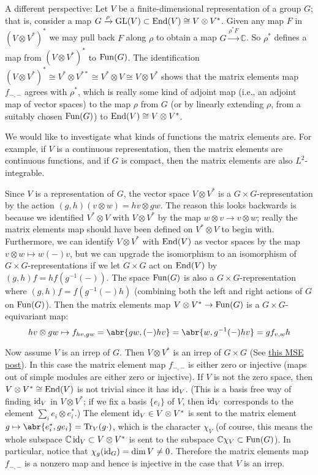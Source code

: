 \documentclass[../../rtnotes.tex]{subfiles}
\begin{document}
A different perspective: Let $V$ be a finite-dimensional representation of a group $G$; that is, consider a map $G\xrightarrow{\rho}\operatorname{GL}(V)\subset \operatorname{End}(V)\cong V\otimes V^\ast$. Given any map $F$ in $(V\otimes V^\ast)^\ast$ we may pull back $F$ along $\rho$ to obtain a map $G\xrightarrow{\rho^\ast F}\mathbb C$. So $\rho^\ast$ defines a map from $(V\otimes V^\ast)^\ast$ to $\operatorname{Fun}(G)$. The identification $(V\otimes V^\ast)^\ast\cong V^\ast\otimes V^{\ast\ast}\cong V^\ast\otimes V\cong V\otimes V^\ast$ shows that the matrix elements map $f_{-,-}$ agrees with $\rho^\ast$, which is really some kind of adjoint map (i.e., an adjoint map of vector spaces) to the map $\rho$ from $G$ (or by linearly extending $\rho$, from a suitably chosen $\operatorname{Fun}(G)$) to $\operatorname{End}(V)\cong V\otimes V^\ast$.

We would like to investigate what kinds of functions the matrix elements are. For example, if $V$ is a continuous representation, then the matrix elements are continuous functions, and if $G$ is compact, then the matrix elements are also $L^2$-integrable. 

Since $V$ is a representation of $G$, the vector space $V\otimes V^\ast$ is a $G\times G$-representation by the action $(g,h)(v\otimes w) = hv\otimes gw$. The reason this looks backwards is because we identified $V^\ast\otimes V$ with $V\otimes V^\ast$ by the map $w\otimes v\to v\otimes w$; really the matrix elements map should have been defined on $V^\ast\otimes V$ to begin with. Furthermore, we can identify $V\otimes V^\ast$ with $\operatorname{End}(V)$ as vector spaces by the map $v\otimes w\mapsto w(-)v$, but we can upgrade the isomorphism to an isomorphism of $G\times G$-representations if we let $G\times G$ act on $\operatorname{End}(V)$ by $(g,h)f = hf(g^{-1}(-))$. The space $\operatorname{Fun}(G)$ is also a $G\times G$-representation where $(g,h)f = f(g^{-1}(-)h)$ (combining both the left and right actions of $G$ on $\operatorname{Fun}(G)$). Then the matrix elements map $V\otimes V^\ast\to \operatorname{Fun}(G)$ is a $G\times G$-equivariant map:
\[hv\otimes gw\mapsto f_{hv,gw} = \abr{gw,(-)hv} = \abr{w,g^{-1}(-)hv} = gf_{v,w}h\]

Now assume $V$ is an irrep of $G$. Then $V\otimes V^\ast$ is an irrep of $G\times G$ (See \href{https://math.stackexchange.com/questions/5013533/proof-that-boxtimes-of-irreducible-representations-is-again-irreducible}{this MSE post}). In this case the matrix element map $f_{-,-}$ is either zero or injective (maps out of simple modules are either zero or injective). If $V$ is not the zero space, then $V\otimes V^\ast\cong \operatorname{End}(V)$ is not trivial since it has $\operatorname{id}_V$. (This is a basis free way of finding $\operatorname{id}_V$ in $V\otimes V^\ast$; if we fix a basis $\{e_i\}$ of $V$, then $\operatorname{id}_V$ corresponds to the element $\sum_i e_i\otimes e_i^\ast$.) The element $\operatorname{id}_V\in V\otimes V^\ast$ is sent to the matrix element $g\mapsto \abr{e_i^\ast,ge_i} = \Tr_V(g\cdot)$, which is the character $\chi_V$ (of course, this means the whole subspace $\mathbb C\operatorname{id}_V\subset V\otimes V^\ast$ is sent to the subspace $\mathbb C\chi_V\subset \operatorname{Fun}(G)$). In particular, notice that $\chi_g(\operatorname{id}_G) = \dim V\neq 0$. Therefore the matrix elements map $f_{-,-}$ is a nonzero map and hence is injective in the case that $V$ is an irrep.
\end{document}
